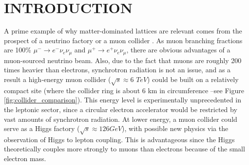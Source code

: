 \documentclass{jacow}
\begin{document}
\section{INTRODUCTION}

A prime example of why matter-dominated lattices are relevant comes from the prospect of a neutrino factory or a muon collider \cite{fermilab}. As muon branching fractions are 100\% $\mu^-\rightarrow e^- \nu_e \nu_\mu$ and $\mu^+\rightarrow e^+ \nu_e \nu_\mu$, there are obvious advantages of a muon-sourced neutrino beam. Also, due to the fact that muons are roughly 200 times heavier than electrons, synchrotron radiation is not an issue, and as a result a high-energy muon collider ($\sqrt{s}\approx 6$ $TeV$) could be built on a relatively compact site (where the collider ring is about 6 km in circumference --see Figure \ref{fig:collider_comparison}). This energy level is experimentally unprecedented in the leptonic sector, since a circular electron accelerator would be restricted by vast amounts of synchrotron radiation. At lower energy, a muon collider could serve as a Higgs factory ($\sqrt{s}\approx 126 GeV$), with possible new physics via the observation of Higgs to lepton coupling. This is advantageous since the Higgs theoretically couples more strongly to muons than electrons because of the small electron mass. 
\end{document}
